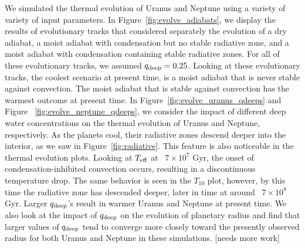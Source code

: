 \documentclass[11pt]{ucscthesisbs}
\begin{document}
We simulated the thermal evolution of Uranus and Neptune using a variety of variety of input parameters. In Figure~\ref{fig:evolve_adiabats}, we display the results of evolutionary tracks  that considered separately the evolution of a dry adiabat, a moist adiabat with condensation but no stable radiative zone, and a moist adiabat with condensation containing stable radiative zones. For all of these evolutionary tracks, we assumed $q_{\rm deep} = 0.25$. Looking at these evolutionary tracks, the coolest scenario at present time, is a moist adiabat that is never stable against convection. The moist adiabat that is stable against convection has the warmest outcome at present time. In Figure~\ref{fig:evolve_uranus_qdeeps} and Figure ~\ref{fig:evolve_neptune_qdeeps}, we consider the impact of different deep water concentrations on the thermal evolution of Uranus and Neptune, respectively. As the planets cool, their radiative zones descend deeper into the interior, as we saw in Figure~\ref{fig:radiative}. This feature is also noticeable in the thermal evolution plots. Looking at $T_{\rm eff}$ at ~$7 \times 10^7$ Gyr, the onset of condensation-inhibited convection occurs, resulting in a discontinuous temperature drop. The same behavior is seen in the $T_{10}$ plot, however, by this time the radiative zone has descended deeper, later in time at around ~$7 \times 10^8$ Gyr. Larger $q_{\rm deep}$'s result in warmer Uranus and Neptune at present time. We also look at the impact of $q_{\rm deep}$ on the evolution of planetary radius and find that larger values of $q_{\rm deep}$ tend to converge more closely toward the presently observed radius for both Uranus and Neptune in these simulations. [needs more work]
\end{document}
